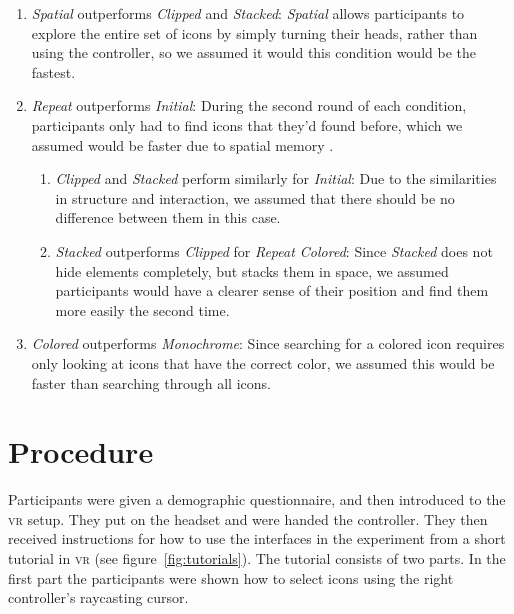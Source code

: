 \documentclass[nobib]{tufte-book} %
\begin{document}
\begin{enumerate}[label=H\arabic*. , wide=0.5em,  leftmargin=*]
  \item \emph{Spatial} outperforms \emph{Clipped} and \emph{Stacked}: \emph{Spatial} allows participants to explore the entire set of icons by simply turning their heads, rather than using the controller, so we assumed it would this condition would be the fastest.
  \item \emph{Repeat} outperforms \emph{Initial}: During the second round of each condition, participants only had to find icons that they'd found before, which we assumed would be faster due to spatial memory \cite{scarr2013supporting}.
  \begin{enumerate}[label=H2.\arabic*. , wide=0.5em,  leftmargin=*]
    \item \emph{Clipped} and \emph{Stacked} perform similarly for \emph{Initial}: Due to the similarities in structure and interaction, we assumed that there should be no difference between them in this case.
    \item \emph{Stacked} outperforms \emph{Clipped} for \emph{Repeat Colored}: Since \emph{Stacked} does not hide elements completely, but stacks them in space, we assumed participants would have a clearer sense of their position and find them more easily the second time.
  \end{enumerate}
  \item \emph{Colored} outperforms \emph{Monochrome}: Since searching for a colored icon requires only looking at icons that have the correct color, we assumed this would be faster than searching through all icons.
\end{enumerate}

\section{Procedure}
Participants were given a demographic questionnaire, and then introduced to the \textsc{vr} setup. They put on the headset and were handed the controller. They then received instructions for how to use the interfaces in the experiment from a short tutorial in \textsc{vr} (see figure~\ref{fig:tutorials}). The tutorial consists of two parts.
In the first part the participants were shown how to select icons using the right controller's raycasting cursor.
\end{document}
